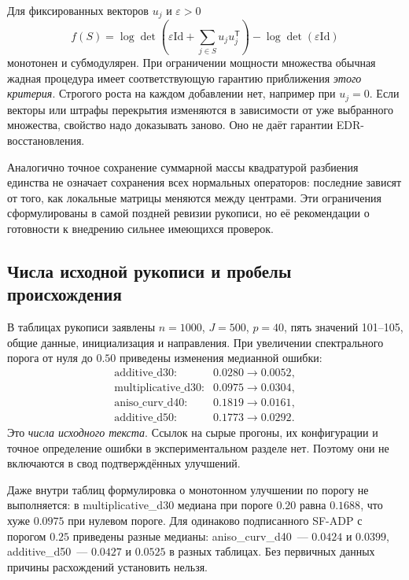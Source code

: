 \documentclass[11pt,a4paper]{article}
\numberwithin{equation}{section}
\newcommand{\Id}{\mathrm{Id}}
\newcommand{\T}{^{\mathsf T}}
\begin{document}
Для фиксированных векторов $u_j$ и $\varepsilon>0$
\[
 f(S)=\log\det\left(\varepsilon\Id+
                  \sum_{j\in S}u_ju_j\T\right)
             -\log\det(\varepsilon\Id)
\]
монотонен и субмодулярен. При ограничении мощности множества
обычная жадная процедура имеет соответствующую гарантию приближения
\emph{этого критерия}. Строгого роста на каждом добавлении нет,
например при $u_j=0$. Если векторы или штрафы перекрытия изменяются
в зависимости от уже выбранного множества, свойство надо доказывать
заново. Оно не даёт гарантии EDR-восстановления.

Аналогично точное сохранение суммарной массы квадратурой разбиения
единства не означает сохранения всех нормальных операторов:
последние зависят от того, как локальные матрицы меняются между центрами.
Эти ограничения сформулированы в самой поздней ревизии рукописи,
но её рекомендации о готовности к внедрению сильнее имеющихся проверок.
\cite{centerstex,centersprotocol}

\subsection{Числа исходной рукописи и пробелы происхождения}

В таблицах рукописи заявлены $n=1000$, $J=500$, $p=40$,
пять значений 101--105, общие данные, инициализация и направления.
При увеличении спектрального порога от нуля до $0.50$
приведены изменения медианной ошибки:
\[
 \begin{array}{ll}
 \text{additive\_d30:}&0.0280\to0.0052,\\
 \text{multiplicative\_d30:}&0.0975\to0.0304,\\
 \text{aniso\_curv\_d40:}&0.1819\to0.0161,\\
 \text{additive\_d50:}&0.1773\to0.0292.
 \end{array}
\]
Это \emph{числа исходного текста}. Ссылок на сырые прогоны,
их конфигурации и точное определение ошибки в экспериментальном
разделе нет. Поэтому они не включаются в свод подтверждённых
улучшений.

Даже внутри таблиц формулировка о монотонном улучшении по порогу
не выполняется: в multiplicative\_d30 медиана при пороге $0.20$
равна $0.1688$, что хуже $0.0975$ при нулевом пороге.
Для одинаково подписанного SF-ADP с порогом $0.25$
приведены разные медианы: aniso\_curv\_d40~--- $0.0424$
и $0.0399$, additive\_d50~--- $0.0427$ и $0.0525$
в разных таблицах. Без первичных данных причины расхождений
установить нельзя.\cite{centerstex}
\end{document}
